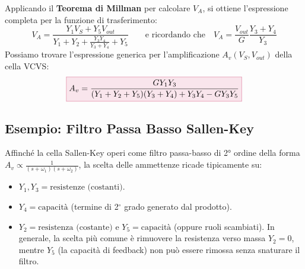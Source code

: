 Applicando il \textbf{Teorema di Millman} per calcolare $V_A$, si ottiene l'espressione completa per la funzione di trasferimento:
\[
V_A = \frac{Y_1 V_S + Y_5 V_{out}}{Y_1 + Y_2 + \frac{Y_3 Y_4}{Y_3+Y_4} + Y_5} \qquad \text{e ricordando che} \quad V_A = \frac{V_{out}}{G} \frac{Y_3 + Y_4}{Y_3}
\]
Possiamo trovare l'espressione generica per l'amplificazione $A_v(V_S, V_{out})$ della cella VCVS:
\begin{equation}
\fcolorbox{purple!60}{purple!10}{$\displaystyle 
    A_v = \frac{G Y_1 Y_3}{(Y_1 + Y_2 + Y_5)(Y_3 + Y_4) + Y_3 Y_4 - G Y_3 Y_5}
$}
\end{equation}

\subsection{Esempio: Filtro Passa Basso Sallen-Key}
Affinché la cella Sallen-Key operi come filtro passa-basso di 2° ordine della forma $A_v \propto \frac{1}{(s + \omega_1)(s + \omega_2)}$, la scelta delle ammettenze ricade tipicamente su:
\begin{itemize}[itemsep=1ex]
    \item $Y_1, Y_3 = \text{resistenze (costanti)}$.
    \item $Y_4 = \text{capacit\`a}$ (termine di 2$^\circ$ grado generato dal prodotto).
    \item $Y_2 = \text{resistenza (costante)}$ e $Y_5 = \text{capacit\`a}$ (oppure ruoli scambiati). In generale, la scelta più comune è rimuovere la resistenza verso massa $Y_2 = 0$, mentre $Y_5$ (la capacità di feedback) non può essere rimossa senza snaturare il filtro.
\end{itemize}

